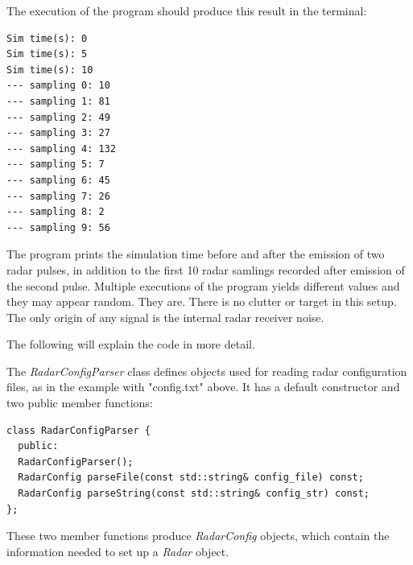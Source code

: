 \documentclass[letterpaper]{book}
\begin{document}
The execution of the program should produce this result in the terminal:
\begin{lstlisting}
Sim time(s): 0
Sim time(s): 5
Sim time(s): 10
--- sampling 0: 10
--- sampling 1: 81
--- sampling 2: 49
--- sampling 3: 27
--- sampling 4: 132
--- sampling 5: 7
--- sampling 6: 45
--- sampling 7: 26
--- sampling 8: 2
--- sampling 9: 56
\end{lstlisting}
The program prints the simulation time before and after the emission of two radar pulses, in addition to the first 10 radar samlings recorded after emission of the second pulse. Multiple executions of the program yields different values and they may appear random. They are. There is no clutter or target in this setup. The only origin of any signal is the internal radar receiver noise. 

The following will explain the code in more detail. 

The \textit{RadarConfigParser} class defines objects used for reading radar configuration files, as in the example with "config.txt" above. It has a default constructor and two public member functions:
\begin{lstlisting}
class RadarConfigParser {
  public:
  RadarConfigParser();
  RadarConfig parseFile(const std::string& config_file) const;
  RadarConfig parseString(const std::string& config_str) const;
};
\end{lstlisting}
These two member functions produce \textit{RadarConfig} objects, which contain the information needed to set up a \textit{Radar} object. 
\end{document}
